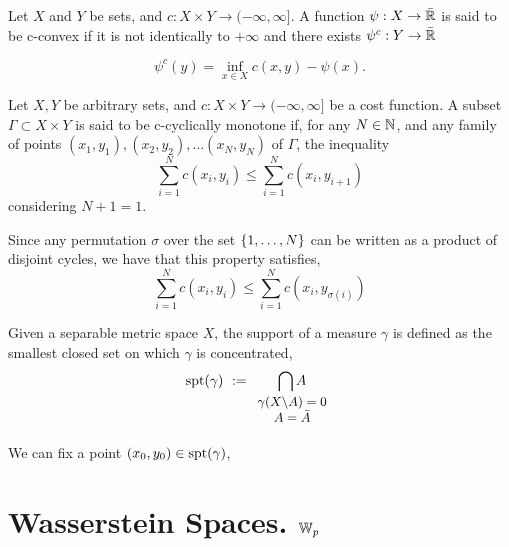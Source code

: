 \begin{definition}[c-transform]
	Let $X$ and $Y$ be sets, and $c:X\times Y \rightarrow (-\infty, \infty]$. A function $\psi: X\rightarrow \bar{\mathbb{R}}$ is said to be c-convex if it is not identically to $+\infty$ and there exists $\psi^c: Y \rightarrow \bar{\mathbb{R}}$
	
	\begin{equation}
		\psi^c(y)= \inf_{x\in X} c(x,y)-\psi(x).
	\end{equation}
\end{definition}

\begin{definition}
	Let $X , Y$ be arbitrary sets, and $c:X\times Y \rightarrow (-\infty, \infty]$ be a cost function. A subset $\Gamma \subset X \times Y$ is said to be c-cyclically monotone if, for any $N\in\mathbb{N}$, and any family of points $(x_1, y_1), (x_2, y_2), \dots (x_N, y_N)$ of $\Gamma$, the inequality
	\begin{equation*}
		\sum_{i=1}^{N} c(x_i, y_i) \leq \sum_{i=1}^{N} c(x_i, y_{i+1}) 
	\end{equation*} 
	considering $N+1=1$. 
\end{definition}
Since any permutation $\sigma$ over the set $\left\lbrace 1, \dots, N \right\rbrace$ can be written as a product of disjoint cycles, we have that this property satisfies,
\begin{equation}
		\sum_{i=1}^{N} c(x_i, y_i) \leq \sum_{i=1}^{N} c(x_i, y_{\sigma(i)}) 
\end{equation}
\begin{definition}
	Given a separable metric space $X$, the support of a measure $\gamma$ is defined as the smallest closed set on which $\gamma$ is concentrated,
	\begin{equation}
	\spt(\gamma)\ :=\underset{\small{\begin{array}{c}
		\gamma(X\backslash A)=0\\ A=\bar{A}  \end{array}}}{\bigcap A} 		
	\end{equation} 
\end{definition}

We can fix a point $(x_0, y_0) \in \mathrm{spt}(\gamma)$, 
\begin{theorem}
	
\end{theorem}


\section{Wasserstein Spaces. $\mathbb{W}_{p}$}